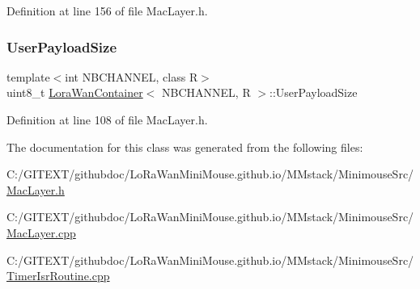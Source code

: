 Definition at line 156 of file Mac\+Layer.\+h.

\mbox{\label{class_lora_wan_container_ac0d2069ce7801e053b0c18c7bcb99461}} 
\subsubsection{\texorpdfstring{User\+Payload\+Size}{UserPayloadSize}}
{\footnotesize\ttfamily template$<$int N\+B\+C\+H\+A\+N\+N\+EL, class R$>$ \\
uint8\+\_\+t \mbox{\hyperlink{class_lora_wan_container}{Lora\+Wan\+Container}}$<$ N\+B\+C\+H\+A\+N\+N\+EL, R $>$\+::User\+Payload\+Size}



Definition at line 108 of file Mac\+Layer.\+h.



The documentation for this class was generated from the following files\+:\begin{DoxyCompactItemize}
\item 
C\+:/\+G\+I\+T\+E\+X\+T/githubdoc/\+Lo\+Ra\+Wan\+Mini\+Mouse.\+github.\+io/\+M\+Mstack/\+Minimouse\+Src/\mbox{\hyperlink{_mac_layer_8h}{Mac\+Layer.\+h}}\item 
C\+:/\+G\+I\+T\+E\+X\+T/githubdoc/\+Lo\+Ra\+Wan\+Mini\+Mouse.\+github.\+io/\+M\+Mstack/\+Minimouse\+Src/\mbox{\hyperlink{_mac_layer_8cpp}{Mac\+Layer.\+cpp}}\item 
C\+:/\+G\+I\+T\+E\+X\+T/githubdoc/\+Lo\+Ra\+Wan\+Mini\+Mouse.\+github.\+io/\+M\+Mstack/\+Minimouse\+Src/\mbox{\hyperlink{_timer_isr_routine_8cpp}{Timer\+Isr\+Routine.\+cpp}}\end{DoxyCompactItemize}
